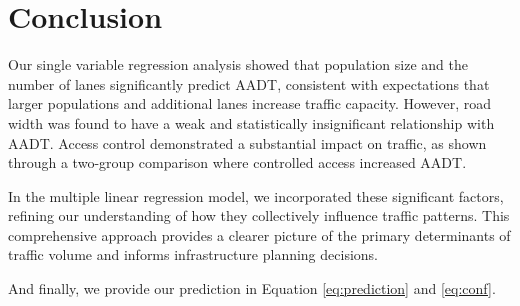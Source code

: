 \section{Conclusion}

Our single variable regression analysis showed that population size and the number of lanes significantly predict AADT, consistent with expectations that larger populations and additional lanes increase traffic capacity. However, road width was found to have a weak and statistically insignificant relationship with AADT. Access control demonstrated a substantial impact on traffic, as shown through a two-group comparison where controlled access increased AADT.

In the multiple linear regression model, we incorporated these significant factors, refining our understanding of how they collectively influence traffic patterns. This comprehensive approach provides a clearer picture of the primary determinants of traffic volume and informs infrastructure planning decisions. 

And finally, we provide our prediction in Equation \ref{eq:prediction} and \ref{eq:conf}.